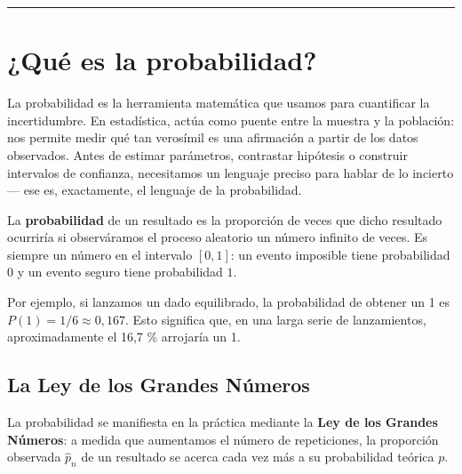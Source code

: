 \documentclass[
  spanish,
  letterpaper,
  DIV=11,
  numbers=noendperiod]{scrartcl}
\begin{document}
\begin{center}\rule{0.5\linewidth}{0.5pt}\end{center}

\section{¿Qué es la probabilidad?}\label{quuxe9-es-la-probabilidad}

La probabilidad es la herramienta matemática que usamos para cuantificar
la incertidumbre. En estadística, actúa como puente entre la muestra y
la población: nos permite medir qué tan verosímil es una afirmación a
partir de los datos observados. Antes de estimar parámetros, contrastar
hipótesis o construir intervalos de confianza, necesitamos un lenguaje
preciso para hablar de lo incierto --- ese es, exactamente, el lenguaje
de la probabilidad.

\begin{tcolorbox}[enhanced jigsaw, arc=.35mm, bottomrule=.15mm, bottomtitle=1mm, breakable, colback=white, colbacktitle=quarto-callout-note-color!10!white, colframe=quarto-callout-note-color-frame, coltitle=black, left=2mm, leftrule=.75mm, opacityback=0, opacitybacktitle=0.6, rightrule=.15mm, title=\textcolor{quarto-callout-note-color}{\faInfo}\hspace{0.5em}{Definición: Probabilidad}, titlerule=0mm, toprule=.15mm, toptitle=1mm]

La \textbf{probabilidad} de un resultado es la proporción de veces que
dicho resultado ocurriría si observáramos el proceso aleatorio un número
infinito de veces. Es siempre un número en el intervalo \([0, 1]\): un
evento imposible tiene probabilidad \(0\) y un evento seguro tiene
probabilidad \(1\).

\end{tcolorbox}

Por ejemplo, si lanzamos un dado equilibrado, la probabilidad de obtener
un 1 es \(P(1) = 1/6 \approx 0{,}167\). Esto significa que, en una larga
serie de lanzamientos, aproximadamente el 16,7 \% arrojaría un 1.

\subsection{La Ley de los Grandes
Números}\label{la-ley-de-los-grandes-nuxfameros}

La probabilidad se manifiesta en la práctica mediante la \textbf{Ley de
los Grandes Números}: a medida que aumentamos el número de repeticiones,
la proporción observada \(\hat{p}_n\) de un resultado se acerca cada vez
más a su probabilidad teórica \(p\).
\end{document}
